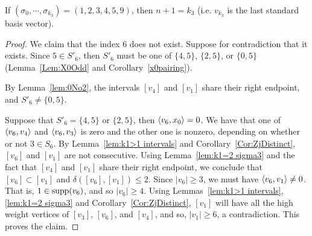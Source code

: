 \begin{prop}\label{1k2=2}
If $(\sigma_0, \cdots, \sigma_{k_3})=(1,2,3,4,5,9)$, then $n+1=k_3$ (i.e. $v_{k_3}$ is the last standard basis vector).
\end{prop}

\begin{proof}
We claim that the index $6$ does not exist. Suppose for contradiction that it exists. Since $5\in S'_6$, then $S'_6$ must be one of $\{4, 5\}$, $\{2, 5\}$, or $\{0, 5\}$ (Lemma~\ref{Lem:X0Odd} and Corollary~\ref{x0pairing}). 

By Lemma~\ref{lem:0No2}, the intervals $[v_4]$ and $[v_1]$ share their right endpoint, and $S'_6\ne\{ 0,5\}$. 

Suppose that $S'_6=\{ 4, 5\}$ or $\{ 2, 5\}$, then $\left\langle v_6 , x_0 \right\rangle=0$. We have that one of $\left\langle v_6 , v_4 \right\rangle$ and $\left\langle v_6 , v_3 \right\rangle$ is zero and the other one is nonzero, depending on whether or not $3\in S_6$. 
By Lemma~\ref{lem:k1>1 intervals} and Corollary~\ref{Cor:ZjDistinct}, $[v_6]$ and $[v_1]$ are not consecutive. 
Using Lemma~\ref{lem:k1=2 sigma3} and the fact that $[v_4]$ and $[v_1]$ share their right endpoint, we conclude that $[v_6]\subset[v_1]$ and $\delta([v_6], [v_1])\le 2$. Since $|v_6|\ge 3$, we must have $\left\langle v_6 , v_1 \right\rangle\not = 0$. That is, $1\in \operatorname{supp}(v_6)$, and so $|v_6|\ge 4$. Using Lemmas~\ref{lem:k1>1 intervals}, \ref{lem:k1=2 sigma3} and Corollary~\ref{Cor:ZjDistinct}, $[v_1]$ will have all the high weight vertices of $[v_3]$, $[v_6]$, and $[v_4]$, and so, $|v_1|\ge 6$, a contradiction. 
 This proves the claim.
\end{proof}


